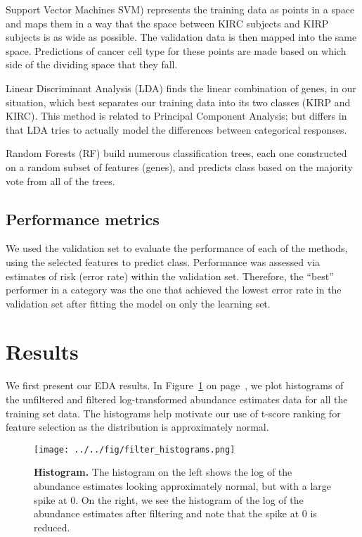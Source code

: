 Support Vector Machines SVM) represents the training data as points in a space
and maps them in a way that the space between KIRC subjects and KIRP subjects
is as wide as possible. The validation data is then mapped into the same space.
Predictions of cancer cell type for these points are made based on which side
of the dividing space that they fall. 

Linear Discriminant Analysis (LDA) finds the linear combination of genes, in
our situation, which best separates our training data into its two classes
(KIRP and KIRC). This method is related to Principal Component Analysis; but
differs in that LDA tries to actually model the differences between categorical
responses.

Random Forests (RF) build numerous classification trees, each one constructed
on a random subset of features (genes), and predicts class based on the
majority vote from all of the trees.

\subsection*{Performance metrics}

We used the validation set to evaluate the performance of each of the methods,
using the selected features to predict class. Performance was assessed via
estimates of risk (error rate) within the validation set. Therefore, the
``best'' performer in a category was the one that achieved the lowest error
rate in the validation set after fitting the model on only the learning set.

\section{Results}

We first present our EDA results.  In Figure~\ref{fig:histogram} on
page~\pageref{fig:histogram}, we plot histograms of the unfiltered
and filtered log-transformed abundance estimates data for all the
training set data.  The histograms help motivate our use of t-score
ranking for feature selection as the distribution is approximately
normal.

\begin{figure}[H]
  \centering
    \texttt{[image: ../../fig/filter\_histograms.png]}
\caption{\textbf{Histogram.} The histogram on the left shows the log of the abundance estimates looking
  approximately normal, but with a large spike at 0.  On the right, we see the
  histogram of the log of the abundance estimates after filtering and note that the spike at 0 is
  reduced.}
   \label{fig:histogram}
\end{figure}

